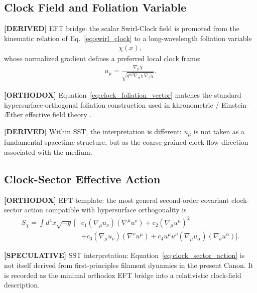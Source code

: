 \documentclass[11pt]{article}
\theoremstyle{definition}
\theoremstyle{plain}
\theoremstyle{remark}
\begin{document}
    \subsection{Clock Field and Foliation Variable}

        \textbf{[DERIVED]} EFT bridge: the scalar Swirl-Clock field is promoted from the kinematic relation
        of Eq.~\eqref{eq:swirl_clock} to a long-wavelength foliation variable
        \begin{align}
            \chi(x),
        \end{align}
        whose normalized gradient defines a preferred local clock frame:
        \begin{align}
            u_\mu
            =
            \frac{\nabla_\mu \chi}
            {\sqrt{g^{\alpha\beta}\nabla_\alpha\chi\,\nabla_\beta\chi}}.
            \label{eq:clock_foliation_vector}
        \end{align}

        \textbf{[ORTHODOX]} Equation~\eqref{eq:clock_foliation_vector} matches the standard hypersurface-orthogonal
        foliation construction used in khronometric / Einstein--\AE ther effective field theory
        \cite{Jacobson2008,BlasPujolasSibiryakov2011}.

        \textbf{[DERIVED]} Within SST, the interpretation is different: \(u_\mu\) is not taken as a fundamental
        spacetime structure, but as the coarse-grained clock-flow direction associated with the medium.

    \subsection{Clock-Sector Effective Action}

        \textbf{[ORTHODOX]} EFT template: the most general second-order covariant clock-sector action compatible
        with hypersurface orthogonality is
        \begin{align}
        S_\chi
        =
        \int d^4x \sqrt{-g}\,
        \Big[
        & c_1 (\nabla_\mu u_\nu)(\nabla^\mu u^\nu)
        + c_2 (\nabla_\mu u^\mu)^2 \nonumber\\
        & + c_3 (\nabla_\mu u_\nu)(\nabla^\nu u^\mu)
        + c_4 u^\mu u^\nu (\nabla_\mu u_\alpha)(\nabla_\nu u^\alpha)
        \Big].
        \label{eq:clock_sector_action}
        \end{align}

        \textbf{[SPECULATIVE]} SST interpretation: Equation~\eqref{eq:clock_sector_action} is not itself derived
        from first-principles filament dynamics in the present Canon. It is recorded as the minimal orthodox EFT
        bridge into a relativistic clock-field description.
\end{document}
